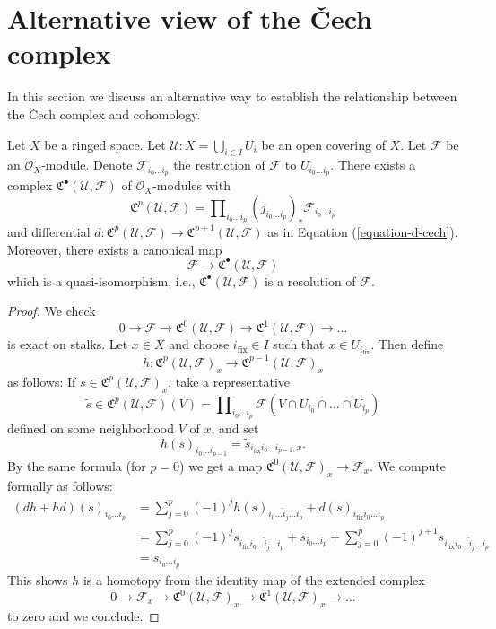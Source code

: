 \section{Alternative view of the {\v C}ech complex}
\label{section-locally-finite-cech}

\noindent
In this section we discuss an alternative way to establish the relationship
between the {\v C}ech complex and cohomology.

\begin{lemma}
\label{lemma-covering-resolution}
Let $X$ be a ringed space. Let $\mathcal{U} : X = \bigcup_{i \in I} U_i$
be an open covering of $X$. Let $\mathcal{F}$ be an $\mathcal{O}_X$-module.
Denote $\mathcal{F}_{i_0 \ldots i_p}$ the restriction of
$\mathcal{F}$ to $U_{i_0 \ldots i_p}$. There exists a complex
${\mathfrak C}^\bullet(\mathcal{U}, \mathcal{F})$
of $\mathcal{O}_X$-modules with
$$
{\mathfrak C}^p(\mathcal{U}, \mathcal{F}) =
\prod\nolimits_{i_0 \ldots i_p}
(j_{i_0 \ldots i_p})_* \mathcal{F}_{i_0 \ldots i_p}
$$
and differential
$d : {\mathfrak C}^p(\mathcal{U}, \mathcal{F})
\to {\mathfrak C}^{p + 1}(\mathcal{U}, \mathcal{F})$
as in Equation (\ref{equation-d-cech}). Moreover, there exists a canonical
map
$$
\mathcal{F} \to {\mathfrak C}^\bullet(\mathcal{U}, \mathcal{F})
$$
which is a quasi-isomorphism, i.e.,
${\mathfrak C}^\bullet(\mathcal{U}, \mathcal{F})$
is a resolution of $\mathcal{F}$.
\end{lemma}

\begin{proof}
We check
$$
0 \to \mathcal{F} \to \mathfrak{C}^0(\mathcal{U}, \mathcal{F}) \to
\mathfrak{C}^1(\mathcal{U}, \mathcal{F}) \to  \ldots
$$
is exact on stalks. Let $x \in X$ and choose $i_{\text{fix}} \in I$
such that $x \in U_{i_{\text{fix}}}$. Then define 
$$
h : \mathfrak{C}^p(\mathcal{U}, \mathcal{F})_x
\to \mathfrak{C}^{p - 1}(\mathcal{U}, \mathcal{F})_x
$$
as follows: If $s \in \mathfrak{C}^p(\mathcal{U}, \mathcal{F})_x$, take
a representative
$$
\widetilde{s} \in
\mathfrak{C}^p(\mathcal{U}, \mathcal{F})(V) =
\prod\nolimits_{i_0 \ldots i_p}
\mathcal{F}(V \cap U_{i_0} \cap \ldots \cap U_{i_p})
$$
defined on some neighborhood $V$ of $x$, and set
$$
h(s)_{i_0 \ldots i_{p - 1}} =
\widetilde{s}_{i_{\text{fix}} i_0 \ldots i_{p - 1}, x}.
$$
By the same formula (for $p = 0$) we get a map
$\mathfrak{C}^{0}(\mathcal{U},\mathcal{F})_x \to \mathcal{F}_x$.
We compute formally as follows:
\begin{align*}
(dh + hd)(s)_{i_0 \ldots i_p}
& =
\sum\nolimits_{j = 0}^p
(-1)^j
h(s)_{i_0 \ldots \hat i_j \ldots i_p}
+
d(s)_{i_{\text{fix}} i_0 \ldots i_p}\\
& =
\sum\nolimits_{j = 0}^p
(-1)^j
s_{i_{\text{fix}} i_0 \ldots \hat i_j \ldots i_p}
+
s_{i_0 \ldots i_p}
+
\sum\nolimits_{j = 0}^p
(-1)^{j + 1}
s_{i_{\text{fix}} i_0 \ldots \hat i_j \ldots i_p} \\
& =
s_{i_0 \ldots i_p}
\end{align*}
This shows $h$ is a homotopy from the identity map of
the extended complex
$$
0 \to \mathcal{F}_x \to \mathfrak{C}^0(\mathcal{U}, \mathcal{F})_x
\to \mathfrak{C}^1(\mathcal{U}, \mathcal{F})_x \to \ldots
$$
to zero and we conclude.
\end{proof}

